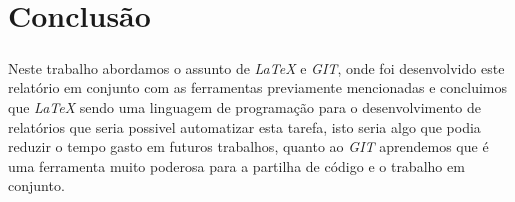 \chapter*{\thechapter \quad Conclusão}
\paragraph{}
Neste trabalho abordamos o assunto de \textit{LaTeX} e \textit{GIT}, onde foi desenvolvido este relatório em conjunto com as ferramentas previamente mencionadas e concluimos que \textit{LaTeX} sendo uma linguagem de programação para o desenvolvimento de relatórios que seria possivel automatizar esta tarefa, isto seria algo que podia reduzir o tempo gasto em futuros trabalhos, quanto ao \textit{GIT} aprendemos que é uma ferramenta muito poderosa para a partilha de código e o trabalho em conjunto.